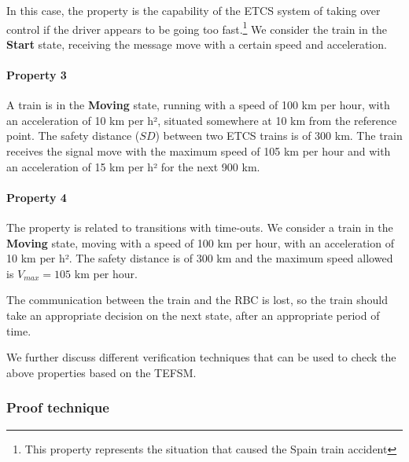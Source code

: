 \documentclass{template/openetcs_article}
\begin{document}
In this case, the property is the capability of the ETCS system of taking over control if the driver appears to be going too fast.\footnote{This property represents the situation that caused the Spain train accident}  We consider the train in the \textbf{Start} state, receiving the message move with a certain speed and acceleration.

\paragraph*{Property 3}

A train is in the \textbf{Moving} state, running with a speed of 100 km per hour, with an acceleration of 10 km per h², situated somewhere at 10 km from the reference point. The safety distance ($SD$) between two ETCS trains is of 300 km. The train receives the signal move with the maximum speed of 105 km per hour and with an acceleration of 15 km per h² for the next 900 km.

\paragraph*{Property 4}

The property is related to transitions with time-outs. We consider a train in the \textbf{Moving} state, moving with a speed of 100 km per hour, with an acceleration of 10 km per h². The safety distance is of 300 km and the maximum speed allowed is $V_{max} = 105$ km per hour. 

The communication between the train and the RBC is lost, so the train should take an appropriate decision on the next state, after an appropriate period of time.
 
We further discuss different verification techniques that can be used to check the above properties based on the TEFSM.

\subsubsection{Proof technique}
\end{document}
